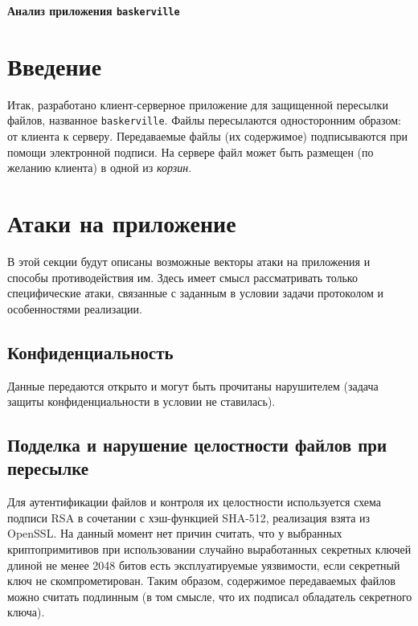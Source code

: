 \documentclass[a4paper,12pt]{article}
\begin{document}
\large
\sffamily
\thispagestyle{fancy}

\begin{center}\LARGE\renewcommand{\baselinestretch}{.9}
\textbf{Анализ приложения {\tt baskerville}}\\
\end{center}

\section*{Введение}

Итак, разработано клиент-серверное приложение для защищенной пересылки файлов, названное {\tt baskerville}.
Файлы пересылаются односторонним образом: от клиента к серверу. Передаваемые файлы (их содержимое)
подписываются при помощи электронной подписи.
На сервере файл может быть размещен (по желанию клиента) в одной из \emph{корзин}.

\section{Атаки на приложение}

В этой секции будут описаны возможные векторы атаки на приложения и способы противодействия им. 
Здесь имеет смысл рассматривать только  специфические атаки, связанные с заданным в условии  задачи протоколом и особенностями реализации.

\subsection{Конфиденциальность}

Данные передаются открыто и могут быть прочитаны нарушителем (задача защиты конфиденциальности в условии не ставилась).

\subsection{Подделка и нарушение целостности файлов при пересылке}

Для аутентификации файлов и контроля их целостности используется схема подписи RSA в сочетании с хэш-функцией SHA-512, реализация взята 
из OpenSSL. На данный момент нет причин считать, что у выбранных криптопримитивов при использовании случайно выработанных секретных ключей длиной не менее 2048 битов
есть эксплуатируемые уязвимости, если секретный ключ не скомпрометирован. Таким образом, содержимое передаваемых файлов можно  считать  подлинным (в том смысле, что их подписал обладатель секретного ключа).
\end{document}
